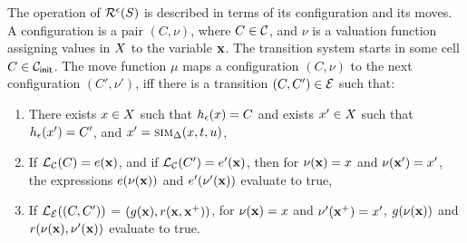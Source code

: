 The operation of $\mathcal{R}^{\epsilon}(S)$ is described in
terms of its configuration and its moves. A configuration is a pair
$(C, \nu)$, where $C \in \mathcal{C}$, and $\nu$ is a valuation function
assigning values in $X$ to the variable $\mathbf{x}$.  The
transition system starts in some cell $C \in \mathcal{C}_{\mathsf{init}}$.  The move
function $\mu$ maps a configuration $(C,\nu)$ to the next
configuration $(C',\nu')$, iff there is a transition $(C,C') \in
\mathcal{E}$ such that:
\begin{enumerate}
\item
There exists $x \in X$ such that
$h_\epsilon(x) = C$ and exists $x' \in
X$ such that $h_\epsilon(x') = C'$,
and $x' = \mbox{\sc sim}_\Delta(x, t, u)$,
\item
If $\mathcal{L}_\mathcal{C}(C) =  e(\mathbf{x})$, and if
$\mathcal{L}_\mathcal{C}(C') = e'(\mathbf{x})$, then for $\nu(\mathbf{x}) =
x$ and $\nu(\mathbf{x}') = x'$, the expressions
$e(\nu(\mathbf{x}))$ and $e'(\nu'(\mathbf{x}))$ evaluate to true,
\item
If $\mathcal{L}_\mathcal{E}((C,C'))$ = $(g(\mathbf{x}), r(\mathbf{x},\mathbf{x}^{+}))$,
for $\nu(\mathbf{x}) = x$ and $\nu'(\mathbf{x}^{+}) = x'$,
$g(\nu(\mathbf{x}))$ and $r(\nu(\mathbf{x}), \nu'(\mathbf{x}))$ evaluate to true.
\end{enumerate}

